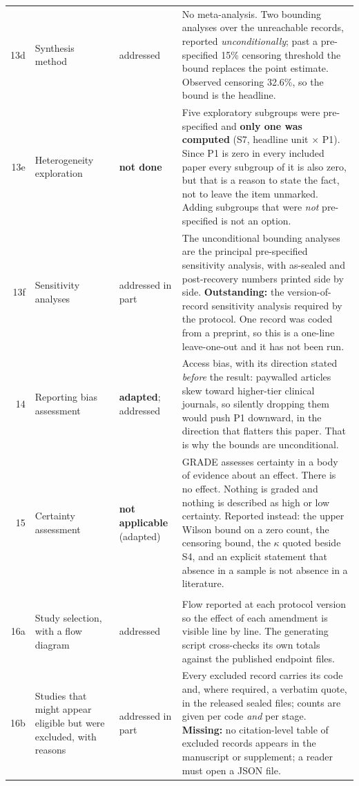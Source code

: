 \documentclass[11pt,a4paper]{article}
\begin{document}
{\begin{longtable}{@{}rL{3.5cm}L{2.6cm}L{6.2cm}@{}}
13d & Synthesis method & addressed & No meta-analysis. Two bounding analyses over the unreachable records, reported \emph{unconditionally}; past a pre-specified 15\% censoring threshold the bound replaces the point estimate. Observed censoring 32.6\%, so the bound is the headline. \\
13e & Heterogeneity exploration & \textbf{not done} & Five exploratory subgroups were pre-specified and \textbf{only one was computed} (S7, headline unit $\times$ P1). Since P1 is zero in every included paper every subgroup of it is also zero, but that is a reason to state the fact, not to leave the item unmarked. Adding subgroups that were \emph{not} pre-specified is not an option. \\
13f & Sensitivity analyses & addressed in part & The unconditional bounding analyses are the principal pre-specified sensitivity analysis, with as-sealed and post-recovery numbers printed side by side. \textbf{Outstanding:} the version-of-record sensitivity analysis required by the protocol. One record was coded from a preprint, so this is a one-line leave-one-out and it has not been run. \\
14 & Reporting bias assessment & \textbf{adapted}; addressed & Access bias, with its direction stated \emph{before} the result: paywalled articles skew toward higher-tier clinical journals, so silently dropping them would push P1 downward, in the direction that flatters this paper. That is why the bounds are unconditional. \\
15 & Certainty assessment & \textbf{not applicable} (adapted) & GRADE assesses certainty in a body of evidence about an effect. There is no effect. Nothing is graded and nothing is described as high or low certainty. Reported instead: the upper Wilson bound on a zero count, the censoring bound, the $\kappa$ quoted beside S4, and an explicit statement that absence in a sample is not absence in a literature. \\
\addlinespace
{} \\
16a & Study selection, with a flow diagram & addressed & Flow reported at each protocol version so the effect of each amendment is visible line by line. The generating script cross-checks its own totals against the published endpoint files. \\
16b & Studies that might appear eligible but were excluded, with reasons & addressed in part & Every excluded record carries its code and, where required, a verbatim quote, in the released sealed files; counts are given per code \emph{and} per stage. \textbf{Missing:} no citation-level table of excluded records appears in the manuscript or supplement; a reader must open a JSON file. \\

\end{longtable}}
\end{document}
